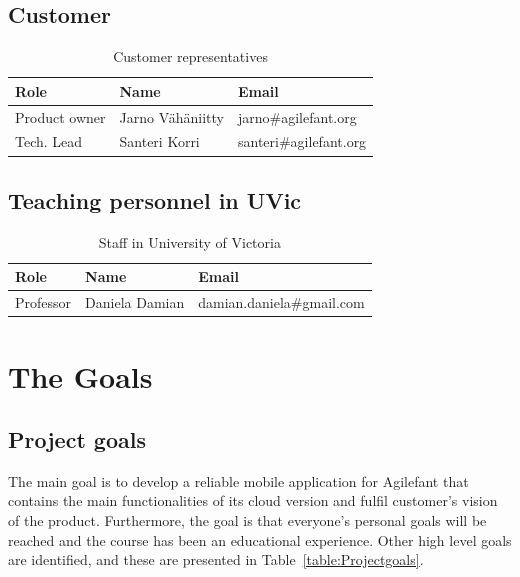 \subsection{Customer}

\begin{table}[H]
\center
\begin{tabular}{|p{2cm}|p{3.8cm}|p{4.1cm}|} 
	
\hline 
\textbf{Role} & \textbf{Name} & \textbf{Email}\\ 
\hline
Product owner & Jarno Vähäniitty & jarno\#agilefant.org\\
\hline
Tech. Lead & Santeri Korri & santeri\#agilefant.org\\
\hline
\end{tabular} 
\caption{Customer representatives}
\label{table:Customer}
\end{table}

\subsection{Teaching personnel in UVic}

\begin{table}[H]
\center
\begin{tabular}{|p{2cm}|p{3.8cm}|p{4.1cm}|} 
	
\hline 
\textbf{Role} & \textbf{Name} & \textbf{Email}\\ 
\hline
Professor & Daniela Damian & damian.daniela\#gmail.com\\
\hline
\end{tabular} 
\caption{Staff in University of Victoria}
\label{table:Customer}
\end{table}



\section{The Goals}
\subsection{Project goals}

The main goal is to develop a reliable mobile application for Agilefant that
contains  the main functionalities of its cloud version and fulfil customer's
vision of  the product. Furthermore, the goal is that everyone's personal goals
will be reached and the course has been an educational experience. Other high
level goals are identified, and these are presented in
Table~\ref{table:Projectgoals}.

